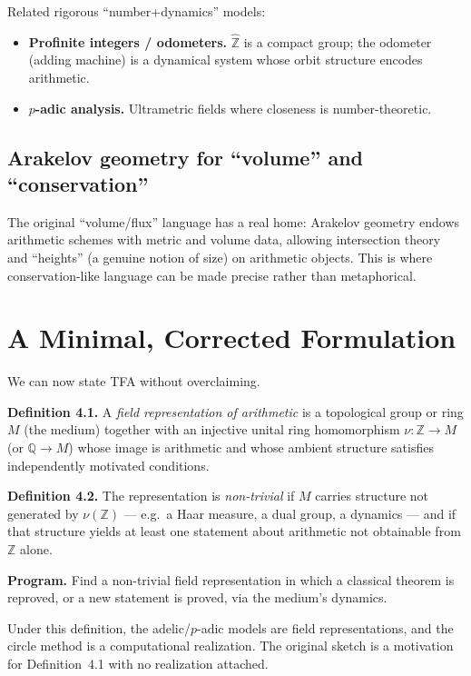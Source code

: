 \documentclass[11pt]{article}
\begin{document}
Related rigorous ``number+dynamics'' models:
\begin{itemize}[leftmargin=1.4em]
\item \textbf{Profinite integers / odometers.} $\hat{\mathbb{Z}}$ is a compact
group; the odometer (adding machine) is a dynamical system whose orbit structure
encodes arithmetic.
\item \textbf{$p$-adic analysis.} Ultrametric fields where closeness is
number-theoretic.
\end{itemize}

\subsection{Arakelov geometry for ``volume'' and ``conservation''}

The original ``volume/flux'' language has a real home: Arakelov geometry endows
arithmetic schemes with metric and volume data, allowing intersection theory and
``heights'' (a genuine notion of size) on arithmetic objects. This is where
conservation-like language can be made precise rather than metaphorical.

\section{A Minimal, Corrected Formulation}

We can now state TFA without overclaiming.

\noindent\textbf{Definition 4.1.} A \emph{field representation of arithmetic} is a
topological group or ring $M$ (the medium) together with an injective unital ring
homomorphism $\nu:\mathbb{Z}\to M$ (or $\mathbb{Q}\to M$) whose image is
arithmetic and whose ambient structure satisfies independently motivated
conditions.

\noindent\textbf{Definition 4.2.} The representation is \emph{non-trivial} if $M$
carries structure not generated by $\nu(\mathbb{Z})$ --- e.g.\ a Haar measure, a
dual group, a dynamics --- and if that structure yields at least one statement
about arithmetic not obtainable from $\mathbb{Z}$ alone.

\noindent\textbf{Program.} Find a non-trivial field representation in which a
classical theorem is reproved, or a new statement is proved, via the medium's
dynamics.

Under this definition, the adelic/$p$-adic models are field representations, and
the circle method is a computational realization. The original sketch is a
motivation for Definition~4.1 with no realization attached.
\end{document}
